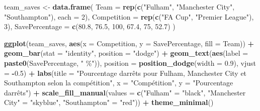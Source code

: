 \documentclass[
]{article}
\newenvironment{Shaded}{\begin{snugshade}}{\end{snugshade}}
\newcommand{\AttributeTok}[1]{\textcolor[rgb]{0.13,0.29,0.53}{#1}}
\newcommand{\DecValTok}[1]{\textcolor[rgb]{0.00,0.00,0.81}{#1}}
\newcommand{\FloatTok}[1]{\textcolor[rgb]{0.00,0.00,0.81}{#1}}
\newcommand{\FunctionTok}[1]{\textcolor[rgb]{0.13,0.29,0.53}{\textbf{#1}}}
\newcommand{\NormalTok}[1]{#1}
\newcommand{\OtherTok}[1]{\textcolor[rgb]{0.56,0.35,0.01}{#1}}
\newcommand{\SpecialCharTok}[1]{\textcolor[rgb]{0.81,0.36,0.00}{\textbf{#1}}}
\newcommand{\StringTok}[1]{\textcolor[rgb]{0.31,0.60,0.02}{#1}}
\begin{document}
\begin{Shaded}
\begin{Highlighting}[]
\NormalTok{team\_saves }\OtherTok{\textless{}{-}} \FunctionTok{data.frame}\NormalTok{(}
  \AttributeTok{Team =} \FunctionTok{rep}\NormalTok{(}\FunctionTok{c}\NormalTok{(}\StringTok{"Fulham"}\NormalTok{, }\StringTok{"Manchester City"}\NormalTok{, }\StringTok{"Southampton"}\NormalTok{), }\AttributeTok{each =} \DecValTok{2}\NormalTok{),}
  \AttributeTok{Competition =} \FunctionTok{rep}\NormalTok{(}\FunctionTok{c}\NormalTok{(}\StringTok{"FA Cup"}\NormalTok{, }\StringTok{"Premier League"}\NormalTok{), }\DecValTok{3}\NormalTok{),}
  \AttributeTok{SavePercentage =} \FunctionTok{c}\NormalTok{(}\FloatTok{80.8}\NormalTok{, }\FloatTok{76.5}\NormalTok{, }\DecValTok{100}\NormalTok{, }\FloatTok{67.4}\NormalTok{, }\DecValTok{75}\NormalTok{, }\FloatTok{52.7}\NormalTok{)}
\NormalTok{)}

\FunctionTok{ggplot}\NormalTok{(team\_saves, }\FunctionTok{aes}\NormalTok{(}\AttributeTok{x =}\NormalTok{ Competition, }\AttributeTok{y =}\NormalTok{ SavePercentage, }\AttributeTok{fill =}\NormalTok{ Team)) }\SpecialCharTok{+}
  \FunctionTok{geom\_bar}\NormalTok{(}\AttributeTok{stat =} \StringTok{"identity"}\NormalTok{, }\AttributeTok{position =} \StringTok{"dodge"}\NormalTok{) }\SpecialCharTok{+}
  \FunctionTok{geom\_text}\NormalTok{(}\FunctionTok{aes}\NormalTok{(}\AttributeTok{label =} \FunctionTok{paste0}\NormalTok{(SavePercentage, }\StringTok{" \%"}\NormalTok{)), }\AttributeTok{position =} \FunctionTok{position\_dodge}\NormalTok{(}\AttributeTok{width =} \FloatTok{0.9}\NormalTok{), }\AttributeTok{vjust =} \SpecialCharTok{{-}}\FloatTok{0.5}\NormalTok{) }\SpecialCharTok{+}
  \FunctionTok{labs}\NormalTok{(}\AttributeTok{title =} \StringTok{"Pourcentage d\textquotesingle{}arrêts pour Fulham, Manchester City et Southampton selon la compétition"}\NormalTok{,}
       \AttributeTok{x =} \StringTok{"Compétition"}\NormalTok{, }\AttributeTok{y =} \StringTok{"Pourcentage d\textquotesingle{}arrêts"}\NormalTok{) }\SpecialCharTok{+}
  \FunctionTok{scale\_fill\_manual}\NormalTok{(}\AttributeTok{values =} \FunctionTok{c}\NormalTok{(}\StringTok{"Fulham"} \OtherTok{=} \StringTok{"black"}\NormalTok{, }\StringTok{"Manchester City"} \OtherTok{=} \StringTok{"skyblue"}\NormalTok{, }\StringTok{"Southampton"} \OtherTok{=} \StringTok{"red"}\NormalTok{)) }\SpecialCharTok{+}
  \FunctionTok{theme\_minimal}\NormalTok{()}
\end{Highlighting}
\end{Shaded}
\end{document}
